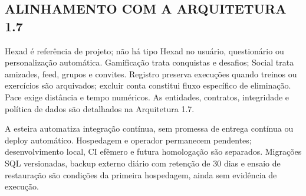 \subsection{ALINHAMENTO COM A ARQUITETURA 1.7}
Hexad é referência de projeto; não há tipo Hexad no usuário, questionário ou personalização automática. Gamificação trata conquistas e desafios; Social trata amizades, feed, grupos e convites. Registro preserva execuções quando treinos ou exercícios são arquivados; excluir conta constitui fluxo específico de eliminação. Pace exige distância e tempo numéricos. As entidades, contratos, integridade e política de dados são detalhados na Arquitetura 1.7.

A esteira automatiza integração contínua, sem promessa de entrega contínua ou deploy automático. Hospedagem e operador permanecem pendentes; desenvolvimento local, CI efêmero e futura homologação são separados. Migrações SQL versionadas, backup externo diário com retenção de 30 dias e ensaio de restauração são condições da primeira hospedagem, ainda sem evidência de execução.
